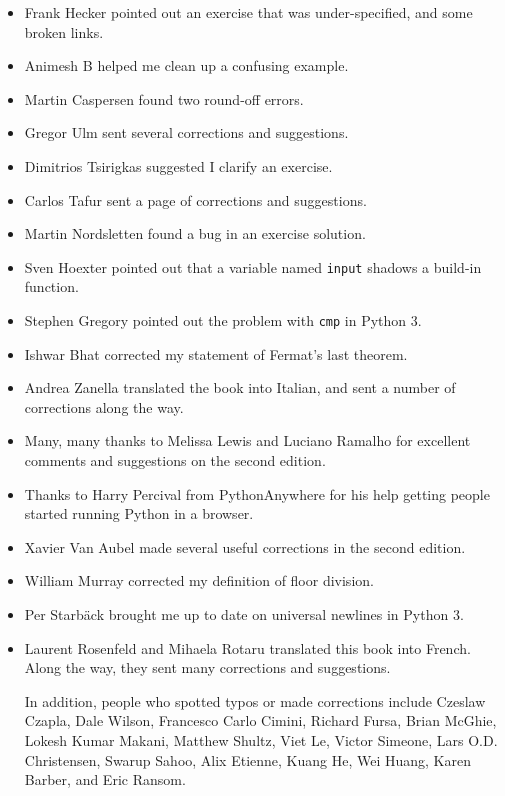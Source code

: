 \documentclass[10pt]{book}
\begin{document}
\begin{itemize}
\item Frank Hecker pointed out an exercise that was under-specified, and
some broken links.

\item Animesh B helped me clean up a confusing example.

\item Martin Caspersen found two round-off errors.

\item Gregor Ulm sent several corrections and suggestions.

\item Dimitrios Tsirigkas suggested I clarify an exercise.

\item Carlos Tafur sent a page of corrections and suggestions.

\item Martin Nordsletten found a bug in an exercise solution.

\item Sven Hoexter pointed out that a variable named {\tt input}
shadows a build-in function.

\item Stephen Gregory pointed out the problem with {\tt cmp}
in Python 3.

\item Ishwar Bhat corrected my statement of Fermat's last theorem.

\item Andrea Zanella translated the book into Italian, and sent a
number of corrections along the way.

\item Many, many thanks to Melissa Lewis and Luciano Ramalho for
  excellent comments and suggestions on the second edition.

\item Thanks to Harry Percival from PythonAnywhere for his help
getting people started running Python in a browser.

\item Xavier Van Aubel made several useful corrections in the second
edition.

\item William Murray corrected my definition of floor division.

\item Per Starb{\"a}ck brought me up to date on universal newlines in Python 3. 

\item Laurent Rosenfeld and Mihaela Rotaru translated this book into French.  Along the way, they sent many corrections and suggestions.


In addition, people who spotted typos or made corrections include
Czeslaw Czapla, Dale Wilson, Francesco Carlo Cimini,
Richard Fursa, Brian McGhie, Lokesh Kumar Makani, Matthew Shultz, Viet
Le, Victor Simeone, Lars O.D. Christensen, Swarup Sahoo, Alix Etienne,
Kuang He, Wei Huang, Karen Barber, and Eric Ransom.




\end{itemize}
\end{document}
